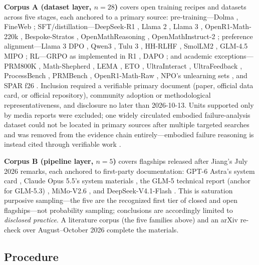 \documentclass[10pt]{article}
\begin{document}
\textbf{Corpus A (dataset layer, $n{=}28$)} covers open training recipes and datasets across five stages, each anchored to a primary source: pre-training---Dolma \cite{ai22024dolma}, FineWeb \cite{hf2024fineweb}; SFT/distillation---DeepSeek-R1 \cite{deepseek2025r1}, Llama 2 \cite{touvron2023llama2}, Llama 3 \cite{grattafiori2024llama3}, OpenR1-Math-220k \cite{hf2025openr1}, Bespoke-Stratos \cite{bespokelabs2025stratos}, OpenMathReasoning \cite{nvidia2025omr}, OpenMathInstruct-2 \cite{nvidia2024omi2}; preference alignment---Llama 3 DPO \cite{grattafiori2024llama3}, Qwen3 \cite{qwen2025qwen3}, Tulu 3 \cite{lambert2025tulu3}, HH-RLHF \cite{anthropic2022hhrlhf}, SmolLM2 \cite{hftb2024smoltalk}, GLM-4.5 MIPO \cite{zai2025glm45}; RL---GRPO as implemented in R1 \cite{deepseek2025r1}, DAPO \cite{yu2025dapo}; and academic exceptions---PRM800K \cite{lightman2023verify}, Math-Shepherd \cite{wang2024mathshepherd}, LEMA \cite{an2023lema}, ETO \cite{song2024eto}, UltraInteract \cite{yuan2024ultrainteract}, UltraFeedback \cite{openbmb2023ultrafeedback}, ProcessBench \cite{zheng2024processbench}, PRMBench \cite{song2025prmbench}, OpenR1-Math-Raw \cite{openr12025mathraw}, NPO's unlearning sets \cite{zhang2024npo}, and SPAR f26 \cite{spar2026f26}. Inclusion required a verifiable primary document (paper, official data card, or official repository), community adoption or methodological representativeness, and disclosure no later than 2026-10-13. Units supported only by media reports were excluded; one widely circulated embodied failure-analysis dataset could not be located in primary sources after multiple targeted searches and was removed from the evidence chain entirely---embodied failure reasoning is instead cited through verifiable work \cite{duan2024aha}.

\textbf{Corpus B (pipeline layer, $n{=}5$)} covers flagships released after Jiang's July 2026 remarks, each anchored to first-party documentation: GPT-6 Astra's system card \cite{openai2026gpt6}, Claude Opus 5.5's system materials \cite{anthropic2026claude}, the GLM-5 technical report (anchor for GLM-5.3) \cite{zai2026glm5}, MiMo-V2.6 \cite{xiaomi2026mimo}, and DeepSeek-V4.1-Flash \cite{deepseek2026v41}. This is saturation purposive sampling---the five are the recognized first tier of closed and open flagships---not probability sampling; conclusions are accordingly limited to \emph{disclosed practice}. A literature corpus (the five families above) and an arXiv re-check over August--October 2026 complete the materials.

\subsection{Procedure}
\end{document}
